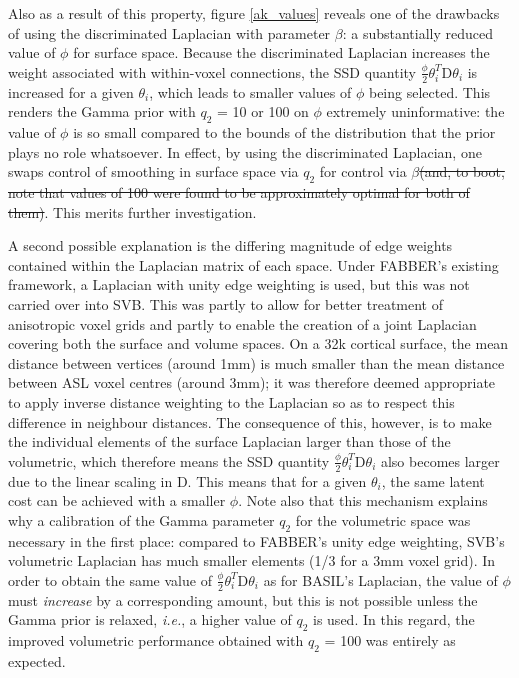 \documentclass[12pt]{report}
\newcommand{\mat}[1]{\mathrm{#1}}
\providecommand{\DIFdeltex}[1]{{\protect\color{red}\sout{#1}}}                      %
\providecommand{\DIFdelbegin}{} %
\providecommand{\DIFdelend}{} %
\providecommand{\DIFdel}[1]{\texorpdfstring{\DIFdeltex{#1}}{}} %
\newcommand{\DIFscaledelfig}{0.5}
\newlength{\DIFdelgraphicswidth} %
\newlength{\DIFdelgraphicsheight} %
\newcommand{\DIFdelincludegraphics}[2][]{%
\sbox{\DIFdelgraphicsbox}{\DIFOincludegraphics[#1]{#2}}%
\settoboxwidth{\DIFdelgraphicswidth}{\DIFdelgraphicsbox} %
\settoboxtotalheight{\DIFdelgraphicsheight}{\DIFdelgraphicsbox} %
\scalebox{\DIFscaledelfig}{%
\parbox[b]{\DIFdelgraphicswidth}{\usebox{\DIFdelgraphicsbox}\\[-\baselineskip] \rule{\DIFdelgraphicswidth}{0em}}\llap{\resizebox{\DIFdelgraphicswidth}{\DIFdelgraphicsheight}{%
\setlength{\unitlength}{\DIFdelgraphicswidth}%
\begin{picture}(1,1)%
\thicklines\linethickness{2pt} %
{\color[rgb]{1,0,0}\put(0,0){\framebox(1,1){}}}%
{\color[rgb]{1,0,0}\put(0,0){\line( 1,1){1}}}%
{\color[rgb]{1,0,0}\put(0,1){\line(1,-1){1}}}%
\end{picture}%
}\hspace*{3pt}}} %
} %
\DeclareRobustCommand{\DIFdelbegin}{\DIFOdelbegin \let\includegraphics\DIFdelincludegraphics} %
\DeclareRobustCommand{\DIFdelend}{\DIFOaddend \let\includegraphics\DIFOincludegraphics} %
\begin{document}
Also as a result of this property, figure \ref{ak_values} reveals one of the drawbacks of using the discriminated Laplacian with parameter $\beta$: a substantially reduced value of $\phi$ for surface space. Because the discriminated Laplacian increases the weight associated with within-voxel connections, the SSD quantity $\frac{\phi}{2}\theta_i^T\mat{D}\theta_i$ is increased for a given $\theta_i$, which leads to smaller values of $\phi$ being selected. This renders the Gamma prior with $q_2$ = 10 or 100 on $\phi$ extremely uninformative: the value of $\phi$ is so small compared to the bounds of the distribution that the prior plays no role whatsoever. In effect, by using the discriminated Laplacian, one swaps control of smoothing in surface space via $q_2$ for control via $\beta$\DIFdelbegin \DIFdel{(and, to boot, note that values of 100 were found to be approximately optimal for both of them)}\DIFdelend . This merits further investigation. 

A second possible explanation is the differing magnitude of edge weights contained within the Laplacian matrix of each space. Under FABBER's existing framework, a Laplacian with unity edge weighting is used, but this was not carried over into SVB. This was partly to allow for better treatment of anisotropic voxel grids and partly to enable the creation of a joint Laplacian covering both the surface and volume spaces. On a 32k cortical surface, the mean distance between vertices (around 1mm) is much smaller than the mean distance between ASL voxel centres (around 3mm); it was therefore deemed appropriate to apply inverse distance weighting to the Laplacian so as to respect this difference in neighbour distances. The consequence of this, however, is to make the individual elements of the surface Laplacian larger than those of the volumetric, which therefore means the SSD quantity $\frac{\phi}{2}\theta_i^T\mat{D}\theta_i$ also becomes larger due to the linear scaling in $\mat{D}$. This means that for a given $\theta_i$, the same latent cost can be achieved with a smaller $\phi$. Note also that this mechanism explains why a calibration of the Gamma parameter $q_2$ for the volumetric space was necessary in the first place: compared to FABBER's unity edge weighting, SVB's volumetric Laplacian has much smaller elements (1/3 for a 3mm voxel grid). In order to obtain the same value of $\frac{\phi}{2}\theta_i^T\mat{D}\theta_i$ as for BASIL's Laplacian, the value of $\phi$ must \textit{increase} by a corresponding amount, but this is not possible unless the Gamma prior is relaxed, \textit{i.e.}, a higher value of $q_2$ is used. In this regard, the improved volumetric performance obtained with $q_2$ = 100 was entirely as expected. 
\end{document}
